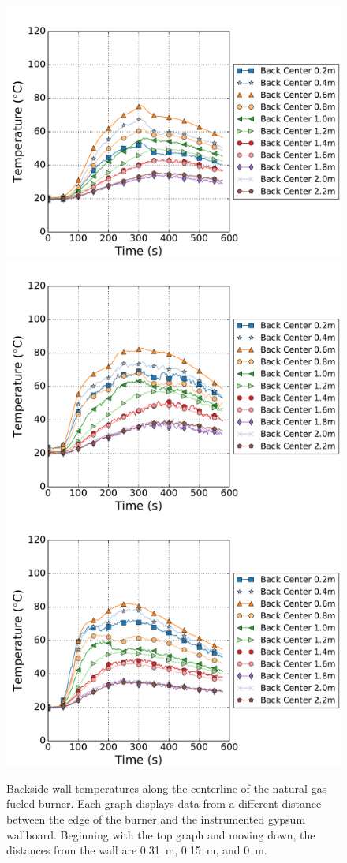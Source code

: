 \documentclass[twoside]{uocthesis}
\begin{document}
\begin{figure}[p]
	\centering
	\includegraphics[width=.625\columnwidth]{../Figures/IWGBNG01_TC_Back_Center_Avg}\\
	\includegraphics[width=.625\columnwidth]{../Figures/IWGBNG04_TC_Back_Center_Avg}\\
	\includegraphics[width=.625\columnwidth]{../Figures/IWGBNG05_TC_Back_Center_Avg}\\
	\caption[Backside wall temperatures for the natural gas fueled burner]{Backside wall temperatures along the centerline of the natural gas fueled burner. Each graph displays data from a different distance between the edge of the burner and the instrumented gypsum wallboard.  Beginning with the top graph and moving down, the distances from the wall are 0.31~m, 0.15~m, and 0~m.}
	\label{IWGB_NG_TC_Backside_set}
\end{figure}
\end{document}
